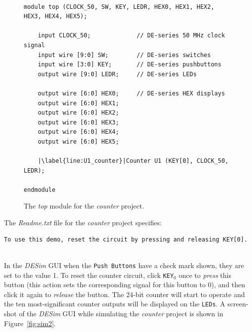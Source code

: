\documentclass[epsfig,10pt,fullpage]{article} \addtolength{\textwidth}{1.5in}
\begin{document}
~\\
\lstset{language=Verilog,numbers=left,escapechar=|}
\begin{figure}[H]
\begin{center}
\begin{minipage}[t]{14 cm}
\begin{lstlisting}[name=top2]
module top (CLOCK_50, SW, KEY, LEDR, HEX0, HEX1, HEX2, HEX3, HEX4, HEX5);

    input CLOCK_50;             // DE-series 50 MHz clock signal
    input wire [9:0] SW;        // DE-series switches
    input wire [3:0] KEY;       // DE-series pushbuttons
    output wire [9:0] LEDR;     // DE-series LEDs   

    output wire [6:0] HEX0;     // DE-series HEX displays
    output wire [6:0] HEX1;
    output wire [6:0] HEX2;
    output wire [6:0] HEX3;
    output wire [6:0] HEX4;
    output wire [6:0] HEX5;

    |\label{line:U1_counter}|Counter U1 (KEY[0], CLOCK_50, LEDR);

endmodule
\end{lstlisting}
\end{minipage}
        \caption{The {\it top} module for the {\it counter} project.}
\label{fig:top2}
\end{center}
\end{figure}
\newpage
\noindent
The {\it Readme.txt} file for the {\it counter} project specifies:

\lstset{language=make,numbers=none,escapechar=|}
\begin{lstlisting}[]
To use this demo, reset the circuit by pressing and releasing KEY[0].
\end{lstlisting}

~\\
In the {\it DESim} GUI when the \texttt{Push Buttons} have a check mark shown, they are set to the
value 1. To reset the counter circuit, click \texttt{KEY}$_0$ once to {\it press} this button
(this action sets the corresponding signal for this button to 0), and then click it again
to {\it release} the button. The 24-bit counter will start to operate and the ten
most-significant counter outputs will be displayed on the \texttt{LEDs}. A screen-shot of
the {\it DESim} GUI while simulating the {\it counter} project is shown in 
Figure~\ref{fig:sim2}.
\end{document}
